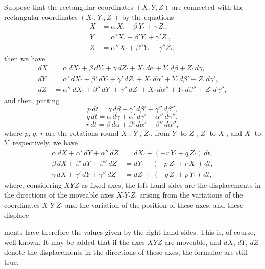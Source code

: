 \documentclass[12pt,a4paper]{article}
\theoremstyle{plain}
\begin{document}
\medskip
Suppose that the rectangular coordinates $(X,Y,Z)$ are connected with the rectangular coordinates $(X_{\prime},Y_{\prime},Z_{\prime})$ by the equations
\begin{align*}
X &= \alpha\,X_{\prime}+\beta\,Y_{\prime}+\gamma\,Z_{\prime},\\
Y &= \alpha'X_{\prime}+\beta'Y_{\prime}+\gamma'Z_{\prime},\\
Z &= \alpha''X_{\prime}+\beta''Y_{\prime}+\gamma''Z_{\prime},
\end{align*}
then we have
\begin{align*}
dX &= \alpha\,dX_{\prime}+\beta\,dY_{\prime}+\gamma\,dZ_{\prime}+X_{\prime}\,d\alpha+Y_{\prime}\,d\beta+Z_{\prime}\,d\gamma,\\
dY &= \alpha'\,dX_{\prime}+\beta'\,dY_{\prime}+\gamma'\,dZ_{\prime}+X_{\prime}\,d\alpha'+Y_{\prime}\,d\beta'+Z_{\prime}\,d\gamma',\\
dZ &= \alpha''\,dX_{\prime}+\beta''\,dY_{\prime}+\gamma''\,dZ_{\prime}+X_{\prime}\,d\alpha''+Y_{\prime}\,d\beta''+Z_{\prime}\,d\gamma'',
\end{align*}
and then, putting
\[
p\,dt=\gamma\,d\beta+\gamma'\,d\beta'+\gamma''\,d\beta'',
\]
\[
q\,dt=\alpha\,d\gamma+\alpha'\,d\gamma'+\alpha''\,d\gamma'',
\]
\[
r\,dt=\beta\,d\alpha+\beta'\,d\alpha'+\beta''\,d\alpha'',
\]
where $p$, $q$, $r$ are the rotations round $X_{\prime}$, $Y_{\prime}$, $Z_{\prime}$, from $Y_{\prime}$ to $Z_{\prime}$, $Z_{\prime}$ to $X_{\prime}$, and $X_{\prime}$ to $Y_{\prime}$ respectively, we have
\begin{align*}
\alpha\,dX+\alpha'\,dY+\alpha''\,dZ &= dX_{\prime}+(-r\,Y_{\prime}+q\,Z_{\prime})\,dt,\\
\beta\,dX+\beta'\,dY+\beta''\,dZ &= dY_{\prime}+(-p\,Z_{\prime}+r\,X_{\prime})\,dt,\\
\gamma\,dX+\gamma'\,dY+\gamma''\,dZ &= dZ_{\prime}+(-q\,Z_{\prime}+p\,Y_{\prime})\,dt,
\end{align*}
where, considering $XYZ$ as fixed axes, the left-hand sides are the displacements in the directions of the moveable axes $X_{\prime}Y_{\prime}Z_{\prime}$ arising from the variations of the coordinates $X_{\prime}Y_{\prime}Z_{\prime}$ and the variation of the position of these axes; and these displace-

\newpage
{} ments have therefore the values given by the right-hand sides. This is, of course, well known. It may be added that if the axes $XYZ$ are moveable, and $dX$, $dY$, $dZ$ denote the displacements in the directions of these axes, the formulae are still true.
\end{document}
